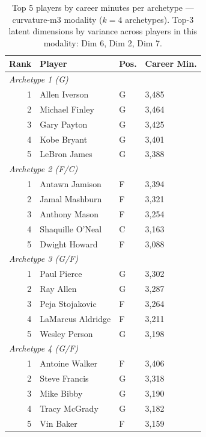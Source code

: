 \begin{table}[htbp]
  \centering\small
  \begin{tabular}{rlll}
    \toprule
    Rank & Player & Pos. & Career Min. \\
    \midrule
    \multicolumn{4}{l}{\textit{Archetype 1 (G)}} \\
    \midrule
    1 & Allen Iverson & G & 3,485 \\
    2 & Michael Finley & G & 3,464 \\
    3 & Gary Payton & G & 3,425 \\
    4 & Kobe Bryant & G & 3,401 \\
    5 & LeBron James & G & 3,388 \\
    \midrule[0.4pt]
    \multicolumn{4}{l}{\textit{Archetype 2 (F/C)}} \\
    \midrule
    1 & Antawn Jamison & F & 3,394 \\
    2 & Jamal Mashburn & F & 3,321 \\
    3 & Anthony Mason & F & 3,254 \\
    4 & Shaquille O'Neal & C & 3,163 \\
    5 & Dwight Howard & F & 3,088 \\
    \midrule[0.4pt]
    \multicolumn{4}{l}{\textit{Archetype 3 (G/F)}} \\
    \midrule
    1 & Paul Pierce & G & 3,302 \\
    2 & Ray Allen & G & 3,287 \\
    3 & Peja Stojakovic & F & 3,264 \\
    4 & LaMarcus Aldridge & F & 3,211 \\
    5 & Wesley Person & G & 3,198 \\
    \midrule[0.4pt]
    \multicolumn{4}{l}{\textit{Archetype 4 (G/F)}} \\
    \midrule
    1 & Antoine Walker & F & 3,406 \\
    2 & Steve Francis & G & 3,318 \\
    3 & Mike Bibby & G & 3,190 \\
    4 & Tracy McGrady & G & 3,182 \\
    5 & Vin Baker & F & 3,159 \\
    \bottomrule
  \end{tabular}
  \caption{Top 5 players by career minutes per archetype --- curvature-m3 modality ($k=4$ archetypes). Top-3 latent dimensions by variance across players in this modality: Dim 6, Dim 2, Dim 7.}
  \label{tab:arch_reps_curvature_m3}
\end{table}

